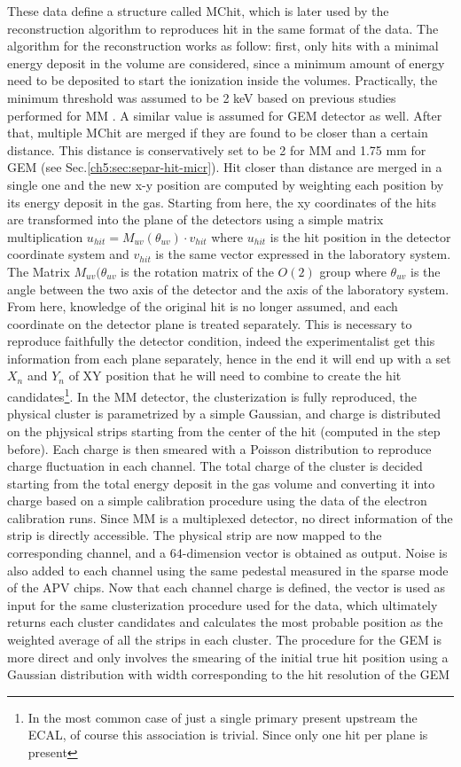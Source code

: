 These data define a structure called MChit, which is later used by the reconstruction algorithm to reproduces hit in the same format of the data. The algorithm for the reconstruction works as follow: first, only hits with a minimal energy deposit in the volume are considered, since a minimum amount of energy need to be deposited to start the ionization inside the volumes. Practically, the minimum threshold was assumed to be 2 keV based on previous studies performed for MM \cite{IGUAZ20121079}. A similar value is assumed for GEM detector as well. After that, multiple MChit are merged if they are found to be closer than a certain distance. This distance is conservatively set to be 2 \mmi for MM and 1.75 mm \mmi for GEM (see Sec.\ref{ch5:sec:separ-hit-micr}). Hit closer than distance are merged in a single one and the new x-y position are computed by weighting each position by its energy deposit in the gas. Starting from here, the xy coordinates of the hits are transformed into the plane of the detectors using a simple matrix multiplication $u_{hit} = M_{uv}(\theta_{uv}) \cdot v_{hit}$ where $u_{hit}$ is the hit position in the detector coordinate system and $v_{hit}$ is the same vector expressed in the laboratory system. The Matrix $M_{uv}(\theta_{uv}$ is the rotation matrix of the $O(2)$ group where $\theta_{uv}$ is the angle between the two axis of the detector and the axis of the laboratory system. From here, knowledge of the original hit is no longer assumed, and each coordinate on the detector plane is treated separately. This is necessary to reproduce faithfully the detector condition, indeed the experimentalist get this information from each plane separately, hence in the end it will end up with a set $X_n$ and $Y_n$ of XY position that he will need to combine to create the hit candidates\footnote{In the most common case of just a single primary present upstream the ECAL, of course this association is trivial. Since only one hit per plane is present}. In the MM detector, the clusterization is fully reproduced, the physical cluster is parametrized by a simple Gaussian, and charge is distributed on the phjysical strips starting from the center of the hit (computed in the step before). Each charge is then smeared with a Poisson distribution to reproduce charge fluctuation in each channel. The total charge of the cluster is decided starting from the total energy deposit in the gas volume and converting it into charge based on a simple calibration procedure using the data of the electron calibration runs. Since MM is a multiplexed detector, no direct information of the strip is directly accessible. The physical strip are now mapped to the corresponding channel, and a 64-dimension vector is obtained as output. Noise is also added to each channel using the same pedestal measured in the sparse mode of the APV chips. Now that each channel charge is defined, the vector is used as input for the same clusterization procedure used for the data, which ultimately returns each cluster candidates and calculates the most probable position as the weighted average of all the strips in each cluster. The procedure for the GEM is more direct and only involves the smearing of the initial true hit position using a Gaussian distribution with width corresponding to the hit resolution of the GEM 